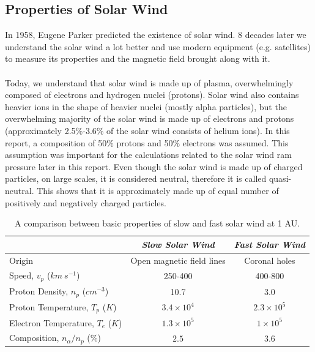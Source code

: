 \documentclass[12pt]{article}
\begin{document}
    \subsection{Properties of Solar Wind}\label{sec:solarwind}
        In 1958, Eugene Parker predicted the existence of solar wind\cite{1958parker}. 8 decades later we understand the solar wind a lot better and use modern equipment (e.g. satellites) to measure its properties and the magnetic field brought along with it.\\ \\
        Today, we understand that solar wind is made up of plasma, overwhelmingly composed of electrons and hydrogen nuclei (protons). Solar wind also contains heavier ions in the shape of heavier nuclei (mostly alpha particles), but the overwhelming majority of the solar wind is made up of electrons and protons (approximately 2.5\%-3.6\% of the solar wind consists of helium ions\cite{2006schwenn}). In this report, a composition of 50\% protons and 50\% electrons was assumed. This assumption was important for the calculations related to the solar wind ram pressure later in this report. Even though the solar wind is made up of charged particles, on large scales, it is considered neutral, therefore it is called quasi-neutral\cite{2007meyer}. This shows that it is approximately made up of equal number of positively and negatively charged particles.\\
        \begin{table}[t!]
            \begin{center}
                \begin{tabular}{|l|c|c|} \hline
                    &\textit{Slow Solar Wind}&\textit{Fast Solar Wind}\\ \hline
                    Origin&Open magnetic field lines&Coronal holes\\ \hline
                    Speed, $v_p$ ($km\ s^{-1}$)&250-400&400-800\\ \hline
                    Proton Density, $n_p$ ($cm^{-3}$)&10.7&3.0\\ \hline
                    Proton Temperature, $T_p$ ($K$)&$3.4\times 10^4$&$2.3\times 10^5$\\ \hline
                    Electron Temperature, $T_e$ ($K$)&$1.3\times 10^5$&$1\times 10^5$\\ \hline
                    Composition, $n_\alpha /n_p$ ($\%$)&$2.5$&$3.6$\\ \hline
                \end{tabular}
                \caption{A comparison between basic properties of slow and fast solar wind at 1 AU.\cite{2006schwenn} \label{tab:slowfast}}
            \end{center}
        \end{table}\\
\end{document}
